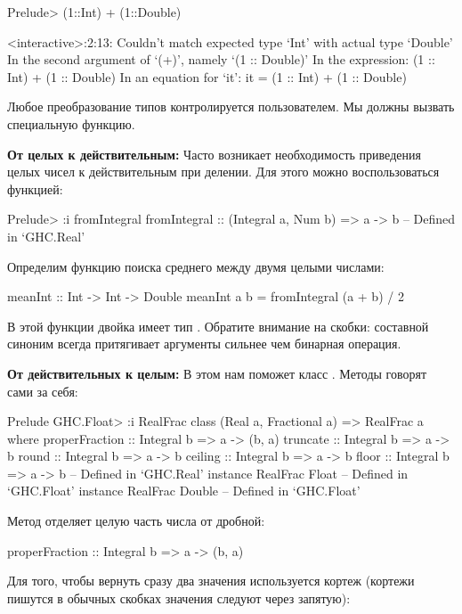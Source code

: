 \begin{code}
Prelude> (1::Int) + (1::Double)

<interactive>:2:13:
    Couldn't match expected type `Int' with actual type `Double'
    In the second argument of `(+)', namely `(1 :: Double)'
    In the expression: (1 :: Int) + (1 :: Double)
    In an equation for `it': it = (1 :: Int) + (1 :: Double)
\end{code}

Любое преобразование типов контролируется пользователем. Мы должны
вызвать специальную функцию.

\textbf{От целых к действительным:} Часто возникает необходимость
приведения целых чисел к действительным при делении. Для этого можно
воспользоваться функцией: 


\begin{code}
Prelude> :i fromIntegral
fromIntegral :: (Integral a, Num b) => a -> b
  	-- Defined in `GHC.Real'
\end{code}

Определим функцию поиска среднего между двумя целыми числами:


\begin{code}
meanInt :: Int -> Int -> Double
meanInt a b = fromIntegral (a + b) / 2
\end{code}

В этой функции двойка имеет тип . Обратите внимание на
скобки: составной синоним всегда притягивает аргументы сильнее чем
бинарная операция.

\textbf{От действительных к целым:} В этом нам поможет класс
. Методы говорят сами за себя:


\begin{code}
Prelude GHC.Float> :i RealFrac
class (Real a, Fractional a) => RealFrac a where
  properFraction :: Integral b => a -> (b, a)
  truncate :: Integral b => a -> b
  round :: Integral b => a -> b
  ceiling :: Integral b => a -> b
  floor :: Integral b => a -> b
  	-- Defined in `GHC.Real'
instance RealFrac Float -- Defined in `GHC.Float'
instance RealFrac Double -- Defined in `GHC.Float'
\end{code}

Метод  отделяет целую часть числа от дробной:


\begin{code}
properFraction :: Integral b => a -> (b, a)
\end{code}

Для того, чтобы вернуть сразу два значения используется кортеж (кортежи
пишутся в обычных скобках значения следуют через запятую):



